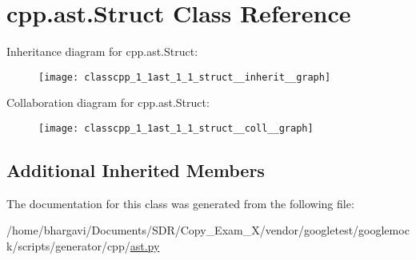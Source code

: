 \hypertarget{classcpp_1_1ast_1_1_struct}{}\section{cpp.\+ast.\+Struct Class Reference}
\label{classcpp_1_1ast_1_1_struct}


Inheritance diagram for cpp.\+ast.\+Struct\+:
\nopagebreak
\begin{figure}[H]
\begin{center}
\leavevmode
\texttt{[image: classcpp\_1\_1ast\_1\_1\_struct\_\_inherit\_\_graph]}
\end{center}
\end{figure}


Collaboration diagram for cpp.\+ast.\+Struct\+:
\nopagebreak
\begin{figure}[H]
\begin{center}
\leavevmode
\texttt{[image: classcpp\_1\_1ast\_1\_1\_struct\_\_coll\_\_graph]}
\end{center}
\end{figure}
\subsection*{Additional Inherited Members}


The documentation for this class was generated from the following file\+:\begin{DoxyCompactItemize}
\item 
/home/bhargavi/\+Documents/\+S\+D\+R/\+Copy\+\_\+\+Exam\+\_\+X/vendor/googletest/googlemock/scripts/generator/cpp/\hyperlink{ast_8py}{ast.\+py}\end{DoxyCompactItemize}
